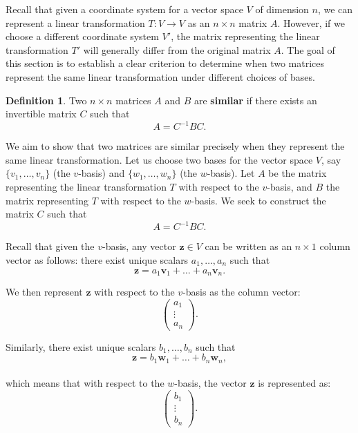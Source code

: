 \documentclass[
]{book}
\theoremstyle{definition}
\newtheorem{definition}{Definition}[chapter]
\theoremstyle{definition}
\theoremstyle{definition}
\theoremstyle{definition}
\theoremstyle{remark}
\begin{document}
Recall that given a coordinate system for a vector space \(V\) of dimension \(n\), we can represent a linear transformation \(T: V \to V\) as an \(n \times n\) matrix \(A\). However, if we choose a different coordinate system \(V'\), the matrix representing the linear transformation \(T'\) will generally differ from the original matrix \(A\). The goal of this section is to establish a clear criterion to determine when two matrices represent the same linear transformation under different choices of bases.

\begin{definition}
Two \(n \times n\) matrices \(A\) and \(B\) are \textbf{similar} if there exists an invertible matrix \(C\) such that\\
\[
A = C^{-1} B C.
\]
\end{definition}

We aim to show that two matrices are similar precisely when they represent the same linear transformation. Let us choose two bases for the vector space \(V\), say \(\{v_1, \dots, v_n\}\) (the \(v\)-basis) and \(\{w_1, \dots, w_n\}\) (the \(w\)-basis). Let \(A\) be the matrix representing the linear transformation \(T\) with respect to the \(v\)-basis, and \(B\) the matrix representing \(T\) with respect to the \(w\)-basis. We seek to construct the matrix \(C\) such that\\
\[
A = C^{-1} B C.
\]

Recall that given the \(v\)-basis, any vector \(\mathbf{z} \in V\) can be written as an \(n \times 1\) column vector as follows: there exist unique scalars \(a_1, \dots, a_n\) such that\\
\[
\mathbf{z} = a_1 \mathbf{v}_1 + \dots + a_n \mathbf{v}_n.
\]

We then represent \(\mathbf{z}\) with respect to the \(v\)-basis as the column vector:\\
\[
\begin{pmatrix}
a_1 \\
\vdots \\
a_n
\end{pmatrix}.
\]

Similarly, there exist unique scalars \(b_1, \dots, b_n\) such that\\
\[
\mathbf{z} = b_1 \mathbf{w}_1 + \dots + b_n \mathbf{w}_n,
\]\\
which means that with respect to the \(w\)-basis, the vector \(\mathbf{z}\) is represented as:\\
\[
\begin{pmatrix}
b_1 \\
\vdots \\
b_n
\end{pmatrix}.
\]
\end{document}
